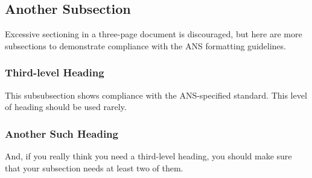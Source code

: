 \documentclass{anstrans}
\begin{document}

\subsection{Another Subsection}
Excessive sectioning in a three-page document is discouraged, but here are more
subsections to demonstrate compliance with the ANS formatting guidelines.

\subsubsection{Third-level Heading}
This subsubsection shows compliance with the ANS-specified standard. This level
of heading should be used rarely.

\subsubsection{Another Such Heading}
And, if you really think you need a third-level heading, you should make sure
that your subsection needs at least two of them.
\end{document}

